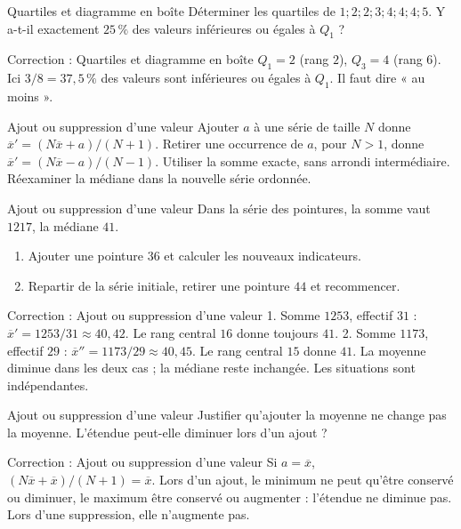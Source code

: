 \documentclass[aspectratio=169,10pt]{beamer}
\begin{document}
\begin{frame}{Quartiles et diagramme en boîte}
Déterminer les quartiles de \(1;2;2;3;4;4;4;5\). Y a-t-il exactement \(25\,\%\) des valeurs inférieures ou égales à \(Q_1\) ?
\end{frame}
\begin{frame}{Correction : Quartiles et diagramme en boîte}
\(Q_1=2\) (rang \(2\)), \(Q_3=4\) (rang \(6\)). Ici \(3/8=37{,}5\,\%\) des valeurs sont inférieures ou égales à \(Q_1\). Il faut dire « au moins ».
\end{frame}
\begin{frame}{Ajout ou suppression d'une valeur}
Ajouter \(a\) à une série de taille \(N\) donne \(\overline x'=(N\overline x+a)/(N+1)\).
Retirer une occurrence de \(a\), pour \(N>1\), donne \(\overline x'=(N\overline x-a)/(N-1)\). Utiliser la somme exacte, sans arrondi intermédiaire. Réexaminer la médiane dans la nouvelle série ordonnée.
\end{frame}
\begin{frame}{Ajout ou suppression d'une valeur}
Dans la série des pointures, la somme vaut \(1217\), la médiane \(41\).

\begin{enumerate}
\setcounter{enumi}{0}\item Ajouter une pointure \(36\) et calculer les nouveaux indicateurs.
\item Repartir de la série initiale, retirer une pointure \(44\) et recommencer.

\end{enumerate}
\end{frame}
\begin{frame}{Correction : Ajout ou suppression d'une valeur}
1. Somme \(1253\), effectif \(31\) : \(\overline x'=1253/31\approx40{,}42\). Le rang central \(16\) donne toujours \(41\). 2. Somme \(1173\), effectif \(29\) : \(\overline x''=1173/29\approx40{,}45\). Le rang central \(15\) donne \(41\). La moyenne diminue dans les deux cas ; la médiane reste inchangée. Les situations sont indépendantes.
\end{frame}
\begin{frame}{Ajout ou suppression d'une valeur}
Justifier qu'ajouter la moyenne ne change pas la moyenne. L'étendue peut-elle diminuer lors d'un ajout ?
\end{frame}
\begin{frame}{Correction : Ajout ou suppression d'une valeur}
Si \(a=\overline x\), \((N\overline x+\overline x)/(N+1)=\overline x\). Lors d'un ajout, le minimum ne peut qu'être conservé ou diminuer, le maximum être conservé ou augmenter : l'étendue ne diminue pas. Lors d'une suppression, elle n'augmente pas.
\end{frame}
\end{document}
